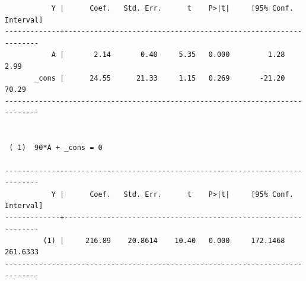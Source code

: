 \documentclass[
  10pt,
]{book}
\newenvironment{Shaded}{\begin{snugshade}}{\end{snugshade}}
\newcommand{\BaseNTok}[1]{\textcolor[rgb]{0.00,0.00,0.81}{#1}}
\newcommand{\DataTypeTok}[1]{\textcolor[rgb]{0.13,0.29,0.53}{#1}}
\newcommand{\KeywordTok}[1]{\textcolor[rgb]{0.13,0.29,0.53}{\textbf{#1}}}
\newcommand{\NormalTok}[1]{#1}
\newcommand{\OtherTok}[1]{\textcolor[rgb]{0.56,0.35,0.01}{#1}}
\begin{document}
\begin{Shaded}
\end{Shaded}

\begin{verbatim}
           Y |      Coef.   Std. Err.      t    P>|t|     [95% Conf. Interval]
-------------+----------------------------------------------------------------
           A |       2.14       0.40     5.35   0.000         1.28        2.99
       _cons |      24.55      21.33     1.15   0.269       -21.20       70.29
------------------------------------------------------------------------------


 ( 1)  90*A + _cons = 0

------------------------------------------------------------------------------
           Y |      Coef.   Std. Err.      t    P>|t|     [95% Conf. Interval]
-------------+----------------------------------------------------------------
         (1) |     216.89    20.8614    10.40   0.000     172.1468    261.6333
------------------------------------------------------------------------------
\end{verbatim}
\end{document}
